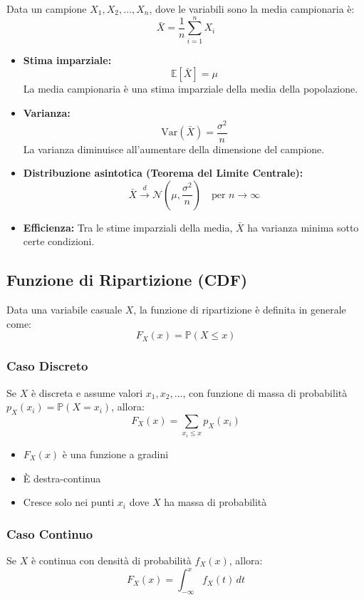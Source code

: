 \documentclass{article}
\begin{document}
Data un campione $X_1, X_2, \dots, X_n$, dove le variabili sono  la media campionaria è:
\[
\bar{X} = \frac{1}{n} \sum_{i=1}^{n} X_i
\]

\begin{itemize}
  \item \textbf{Stima imparziale:} 
  \[
  \mathbb{E}[\bar{X}] = \mu
  \]
  La media campionaria è una stima imparziale della media della popolazione.

  \item \textbf{Varianza:}
  \[
  \mathrm{Var}(\bar{X}) = \frac{\sigma^2}{n}
  \]
  La varianza diminuisce all'aumentare della dimensione del campione.

  \item \textbf{Distribuzione asintotica (Teorema del Limite Centrale):}
  \[
  \bar{X} \xrightarrow{d} \mathcal{N} \left( \mu, \frac{\sigma^2}{n} \right) \quad \text{per } n \to \infty
  \]

  \item \textbf{Efficienza:} 
  Tra le stime imparziali della media, $\bar{X}$ ha varianza minima sotto certe condizioni.
\end{itemize}

\subsection*{Funzione di Ripartizione (CDF)}

Data una variabile casuale $X$, la funzione di ripartizione è definita in generale come:
\[
F_X(x) = \mathbb{P}(X \leq x)
\]

\subsubsection*{Caso Discreto}
Se $X$ è discreta e assume valori $x_1, x_2, \dots$, con funzione di massa di probabilità $p_X(x_i) = \mathbb{P}(X = x_i)$, allora:
\[
F_X(x) = \sum_{x_i \leq x} p_X(x_i)
\]

\begin{itemize}
  \item $F_X(x)$ è una funzione a gradini
  \item È destra-continua
  \item Cresce solo nei punti $x_i$ dove $X$ ha massa di probabilità
\end{itemize}

\subsubsection*{Caso Continuo}
Se $X$ è continua con densità di probabilità $f_X(x)$, allora:
\[
F_X(x) = \int_{-\infty}^{x} f_X(t) \, dt
\]
\end{document}
